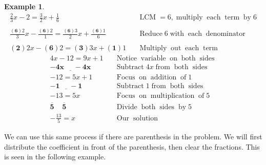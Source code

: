\documentclass[12pt]{book}
\theoremstyle{definition}
\newtheorem{example}{Example}
\newcommand{\tmmathbf}[1]{\ensuremath{\boldsymbol{#1}}}
\newcommand{\tmop}[1]{\ensuremath{\operatorname{#1}}}
\begin{document}
\begin{example}\label{Lin31}
  \begin{eqnarray*}
    \frac{2}{3} x - 2 = \frac{3}{2} x + \frac{1}{6} &  & \tmop{LCM} = 6,
    \tmop{multiply} \tmop{each} \tmop{term} \tmop{by} 6\\
    &  & \\
    \frac{\tmmathbf{(6)} 2}{3} x - \frac{\tmmathbf{(6)} 2}{1} =
    \frac{\tmmathbf{(6)} 3}{2} x + \frac{\tmmathbf{(6)} 1}{6} &  &
    \tmop{Reduce} 6 \tmop{with} \tmop{each} \tmop{denominator}\\
    &  & \\
    \tmmathbf{(2)} 2 x - \tmmathbf{(6)} 2 = \tmmathbf{(3)} 3 x +
    \tmmathbf{(1)} 1 &  & \tmop{Multiply} \tmop{out} \tmop{each} \tmop{term}
  \end{eqnarray*}
  \begin{eqnarray*}
    4 x - 12 = 9 x + 1 &  & \tmop{Notice} \tmop{variable} \tmop{on}
    \tmop{both} \tmop{sides}\\
    \underline{\tmmathbf{- 4 x ~~~~~~- 4 x}}~~~~  &  & \tmop{Subtract} 4 x \tmop{from}
    \tmop{both} \tmop{sides}\\
    - 12 = 5 x + 1 &  & \tmop{Focus} \tmop{on} \tmop{addition} \tmop{of} 1\\
    \tmmathbf{\underline{- 1 ~~~~~~- 1}} &  & \tmop{Subtract} 1 \tmop{from}
    \tmop{both} \tmop{sides}\\
    - 13 = 5 x &  & \tmop{Focus} \tmop{on} \tmop{multiplication} \tmop{of} 5\\
    \tmmathbf{\overline{5} ~~~~~ \overline{5}}~  &  & \tmop{Divide} \tmop{both}
    \tmop{sides} \tmop{by} 5\\
    - \frac{13}{5} = x &  & \tmop{Our} \tmop{solution}
  \end{eqnarray*}
\end{example}
We can use this same process if there are parenthesis in the problem. We will first distribute the coefficient in front of the parenthesis, then clear the fractions. This is seen in the following example.
\end{document}
